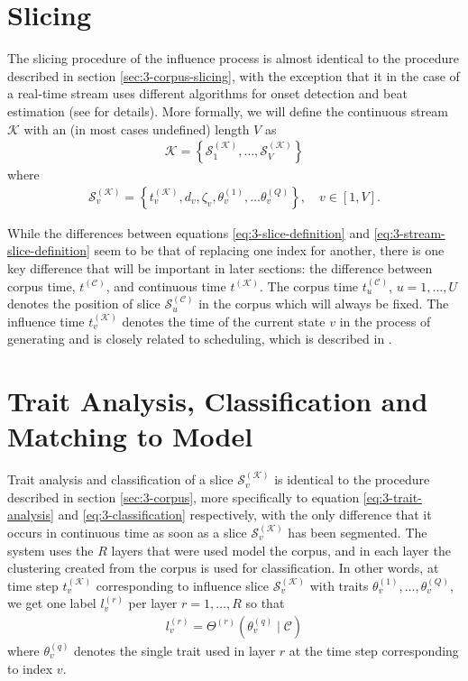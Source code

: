 \section{Slicing}\label{sec:3-influence-slicing}
The slicing procedure of the influence process is almost identical to the procedure described in section \ref{sec:3-corpus-slicing}, with the exception that it in the case of a real-time stream uses different algorithms for onset detection and beat estimation (see \cite{borg_2019} for details). More formally, we will define the continuous stream $\mathcal K$ with an (in most cases undefined) length $V$ as
\begin{align}
	\mathcal K 	= \left\lbrace \mathcal S_1^{(\mathcal K)}, \dots, \mathcal S_V^{(\mathcal K)} \right\rbrace
\end{align}
where
\begin{align}\label{eq:3-stream-slice-definition}
	\mathcal S_v^{(\mathcal K)} = \left\lbrace t_v^{(\mathcal K)}, d_v, \zeta_v, \theta_v^{(1)},\dots\theta_v^{(Q)}\right\rbrace, \quad v \in [1, V].
\end{align}

While the differences between equations \ref{eq:3-slice-definition} and \ref{eq:3-stream-slice-definition} seem to be that of replacing one index for another, there is one key difference that will be important in later sections: the difference between corpus time, $t^{(\mathcal C)}$, and continuous time $t^{(\mathcal K)}$. The corpus time $t^{(\mathcal C)}_u$, $u=1,\dots,U$ denotes the position of slice $\mathcal S_u^{(\mathcal C)}$ in the corpus which will always be fixed. The influence time $t^{(\mathcal K)}_v$ denotes the time of the current state $v$ in the process of generating and is closely related to scheduling, which is described in \cite{somaxsoftware2021}.


\section{Trait Analysis, Classification and Matching to Model}\label{sec:3-influence-traits}
Trait analysis and classification of a slice $\mathcal S_v^{(\mathcal K)}$ is identical to the procedure described in section \ref{sec:3-corpus}, more specifically to equation \ref{eq:3-trait-analysis} and \ref{eq:3-classification} respectively, with the only difference that it occurs in continuous time as soon as a slice $\mathcal S_v^{(\mathcal K)}$ has been segmented. 
The system uses the $R$ layers that were used model the corpus, and in each layer the clustering created from the corpus is used for classification. In other words, at time step $t^{(\mathcal K)}_v$ corresponding to influence slice $\mathcal S_v^{(\mathcal K)}$ with traits $\theta_v^{(1)},\dots,\theta_v^{(Q)}$, we get one label $l_v^{(r)}$ per layer $r = 1,\dots, R$ so that 
\begin{align}\label{eq:3-influence-classification}
	l_v^{(r)} = \Theta^{(r)}\left(\theta^{(q)}_v \mid \mathcal C \right)
\end{align}
where $\theta^{(q)}_v$ denotes the single trait used in layer $r$ at the time step corresponding to index $v$.


